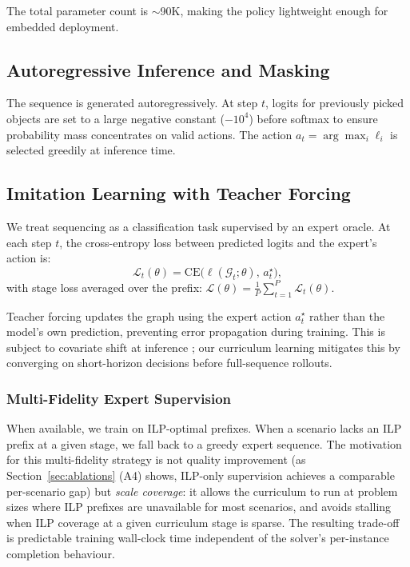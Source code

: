 \documentclass[conference]{IEEEtran}
\begin{document}
The total parameter count is ${\sim}$90K, making the policy lightweight enough for embedded deployment.

\subsection{Autoregressive Inference and Masking}

The sequence is generated autoregressively. At step $t$, logits for previously picked objects are set to a large negative constant ($-10^4$) before softmax to ensure probability mass concentrates on valid actions. The action $a_t = \arg\max_i \ell_i$ is selected greedily at inference time.

\subsection{Imitation Learning with Teacher Forcing}

We treat sequencing as a classification task supervised by an expert oracle. At each step $t$, the cross-entropy loss between predicted logits and the expert's action is:
\begin{equation}
\mathcal{L}_t(\theta) = \text{CE}\big(\ell(\mathcal{G}_t;\theta),\, a_t^\star\big),
\end{equation}
with stage loss averaged over the prefix: $\mathcal{L}(\theta) = \frac{1}{P}\sum_{t=1}^{P}\mathcal{L}_t(\theta)$.

Teacher forcing updates the graph using the expert action $a_t^\star$ rather than the model's own prediction, preventing error propagation during training. This is subject to covariate shift at inference \cite{ross2011dagger}; our curriculum learning mitigates this by converging on short-horizon decisions before full-sequence rollouts.

\subsubsection{Multi-Fidelity Expert Supervision}
When available, we train on ILP-optimal prefixes. When a scenario lacks an ILP prefix at a given stage, we fall back to a greedy expert sequence. The motivation for this multi-fidelity strategy is not quality improvement (as Section~\ref{sec:ablations} (A4) shows, ILP-only supervision achieves a comparable per-scenario gap) but \emph{scale coverage}: it allows the curriculum to run at problem sizes where ILP prefixes are unavailable for most scenarios, and avoids stalling when ILP coverage at a given curriculum stage is sparse. The resulting trade-off is predictable training wall-clock time independent of the solver's per-instance completion behaviour.
\end{document}
